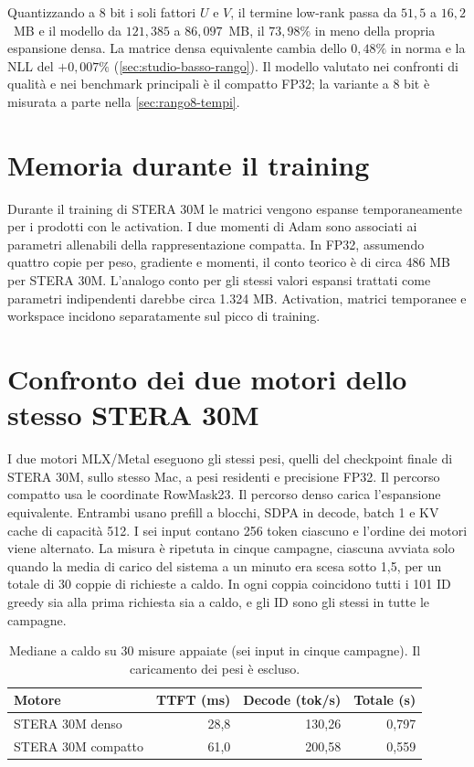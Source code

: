 Quantizzando a 8 bit i soli fattori $U$ e $V$, il termine low-rank passa da $51{,}5$ a $16{,}2$~MB e il modello da $121{,}385$ a $86{,}097$~MB, il $73{,}98\%$ in meno della propria espansione densa. La matrice densa equivalente cambia dello $0{,}48\%$ in norma e la NLL del $+0{,}007\%$ (\autoref{sec:studio-basso-rango}). Il modello valutato nei confronti di qualità e nei benchmark principali è il compatto FP32; la variante a 8 bit è misurata a parte nella \autoref{sec:rango8-tempi}.

\section{Memoria durante il training}

Durante il training di STERA 30M le matrici vengono espanse temporaneamente per i prodotti con le activation. I due momenti di Adam sono associati ai parametri allenabili della rappresentazione compatta. In FP32, assumendo quattro copie per peso, gradiente e momenti, il conto teorico è di circa 486 MB per STERA 30M. L'analogo conto per gli stessi valori espansi trattati come parametri indipendenti darebbe circa 1.324 MB. Activation, matrici temporanee e workspace incidono separatamente sul picco di training.

\section{Confronto dei due motori dello stesso STERA 30M}
\label{sec:replica-stera-dense}

I due motori MLX/Metal eseguono gli stessi pesi, quelli del checkpoint finale di STERA 30M, sullo stesso Mac, a pesi residenti e precisione FP32. Il percorso compatto usa le coordinate RowMask23. Il percorso denso carica l'espansione equivalente. Entrambi usano prefill a blocchi, SDPA in decode, batch 1 e KV cache di capacità 512. I sei input contano 256 token ciascuno e l'ordine dei motori viene alternato. La misura è ripetuta in cinque campagne, ciascuna avviata solo quando la media di carico del sistema a un minuto era scesa sotto 1,5, per un totale di 30 coppie di richieste a caldo. In ogni coppia coincidono tutti i 101 ID greedy sia alla prima richiesta sia a caldo, e gli ID sono gli stessi in tutte le campagne.

\begin{table}[htbp]
\centering
\begin{tabular}{lrrr}
\toprule
Motore & TTFT (ms) & Decode (tok/s) & Totale (s) \\
\midrule
STERA 30M denso & 28,8 & 130,26 & 0,797 \\
STERA 30M compatto & 61,0 & 200,58 & 0,559 \\
\bottomrule
\end{tabular}
\caption{Mediane a caldo su 30 misure appaiate (sei input in cinque campagne). Il caricamento dei pesi è escluso.}
\label{tab:replica-stera-dense}
\end{table}

